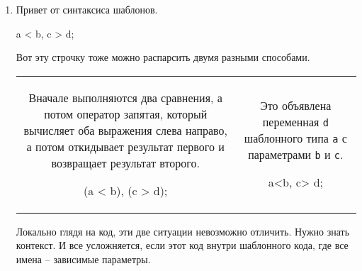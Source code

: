 \begin{enumerate}
\begin{enumerate}
\item Привет от синтаксиса шаблонов.
\begin{cppcode}
a < b, c > d;
\end{cppcode}
Вот эту строчку тоже можно распарсить двумя разными способами.
\begin{center}
\begin{tabular}{cc}
{
\begin{minipage}[b]{7cm}
Вначале выполняются два сравнения, а потом оператор запятая, который вычисляет оба выражения слева направо, а потом откидывает результат первого и возвращает результат второго.
\begin{cppcode}[numbers=none]
(a < b), (c > d);
\end{cppcode}
\end{minipage}
}&{
\begin{minipage}[b]{7cm}
Это объявлена переменная \verb"d" шаблонного типа \verb"a" с параметрами \verb"b" и \verb"c".
\begin{cppcode}[numbers=none]
a<b, c> d;
\end{cppcode}
\end{minipage}
}\\
\end{tabular}
\end{center}
Локально глядя на код, эти две ситуации невозможно отличить.
Нужно знать контекст.
И все усложняется, если этот код внутри шаблонного кода, где все имена -- зависимые параметры.
\end{enumerate}


\end{enumerate}
